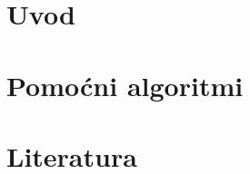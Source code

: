 \documentclass[pdftex,12pt,a4paper]{report}
\begin{document}


\tableofcontents

\chapter{Uvod}


\chapter{Pomoćni algoritmi}



\chapter{Literatura}
%
%
%
 
\end{document}
